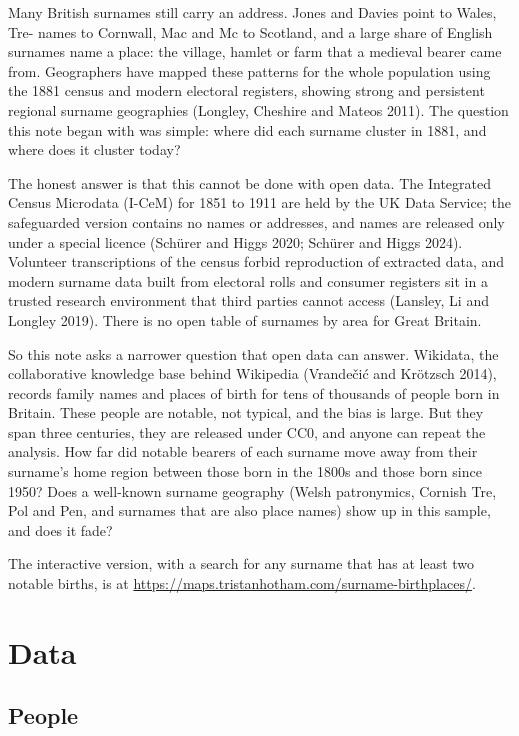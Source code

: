 \documentclass[11pt,a4paper]{article}
\begin{document}
Many British surnames still carry an address. Jones and Davies point to Wales, Tre- names to Cornwall, Mac and Mc to Scotland, and a large share of English surnames name a place: the village, hamlet or farm that a medieval bearer came from. Geographers have mapped these patterns for the whole population using the 1881 census and modern electoral registers, showing strong and persistent regional surname geographies (Longley, Cheshire and Mateos 2011). The question this note began with was simple: where did each surname cluster in 1881, and where does it cluster today?

The honest answer is that this cannot be done with open data. The Integrated Census Microdata (I-CeM) for 1851 to 1911 are held by the UK Data Service; the safeguarded version contains no names or addresses, and names are released only under a special licence (Schürer and Higgs 2020; Schürer and Higgs 2024). Volunteer transcriptions of the census forbid reproduction of extracted data, and modern surname data built from electoral rolls and consumer registers sit in a trusted research environment that third parties cannot access (Lansley, Li and Longley 2019). There is no open table of surnames by area for Great Britain.

So this note asks a narrower question that open data can answer. Wikidata, the collaborative knowledge base behind Wikipedia (Vrandečić and Krötzsch 2014), records family names and places of birth for tens of thousands of people born in Britain. These people are notable, not typical, and the bias is large. But they span three centuries, they are released under CC0, and anyone can repeat the analysis. How far did notable bearers of each surname move away from their surname's home region between those born in the 1800s and those born since 1950? Does a well-known surname geography (Welsh patronymics, Cornish Tre, Pol and Pen, and surnames that are also place names) show up in this sample, and does it fade?

The interactive version, with a search for any surname that has at least two notable births, is at \url{https://maps.tristanhotham.com/surname-birthplaces/}.

\section{Data}

\subsection{People}
\end{document}

